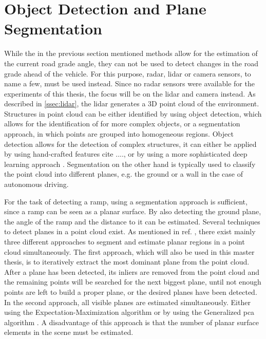 \section{Object Detection and Plane Segmentation}
While the in the previous section mentioned methods allow for the estimation of the current road grade angle, they can not be used to detect changes in the road grade ahead of the vehicle.
For this purpose, \gls{radar}, \gls{lidar} or camera sensors, to name a few, must be used instead.
Since no \gls{radar} sensors were available for the experiments of this thesis, the focus will be on the \gls{lidar} and camera instead.
As described in \cref{ssec:lidar}, the \gls{lidar} generates a 3D point cloud of the environment.
Structures in point cloud can be either identified by using object detection, which allows for the identification of for more complex objects, or a segmentation approach, in which points are grouped into homogeneous regions.
Object detection allows for the detection of complex structures, it can either be applied by using hand-crafted features cite ...., or by using a more sophisticated deep learning approach \cite{Qi2017, Qi2017b, Zhuo2018}.
Segmentation on the other hand is typically used to classify the point cloud into different planes, e.g. the ground or a wall in the case of autonomous driving.\par
For the task of detecting a ramp, using a segmentation approach is sufficient, since a ramp can be seen as a planar surface.
By also detecting the ground plane, the angle of the ramp and the distance to it can be estimated.
Several techniques to detect planes in a point cloud exist.
As mentioned in ref. \cite{Gallo2008}, there exist mainly three different approaches to segment and estimate planar regions in a point cloud simultaneously.
The first approach, which will also be used in this master thesis, is to iteratively extract the most dominant plane from the point cloud.
After a plane has been detected, its inliers are removed from the point cloud and the remaining points will be searched for the next biggest plane, until not enough points are left to build a proper plane, or the desired planes have been detected.
In the second approach, all visible planes are estimated simultaneously.
Either using the Expectation-Maximization algorithm \cite{Liu2001, Triebel2005} or by using the Generalized \gls{pca} algorithm \cite{Vidal2005}.
A disadvantage of this approach is that the number of planar surface elements in the scene must be estimated.
